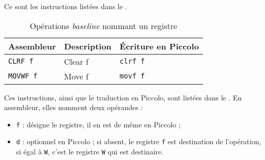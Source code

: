 
Ce sont les instructions listées dans le .



\begin{table}[!ht]
  \centering
  \small
  \begin{tabular}{lll}
    \textbf{Assembleur} & \textbf{Description} & \textbf{Écriture en Piccolo}\\
    \hline
    \texttt{CLRF f} & Clear f & \texttt{clrf f} \\
    \texttt{MOVWF f} & Move f & \texttt{movf f} \\
  \hline
  \end{tabular}
  \caption{Opérations \emph{baseline} nommant un registre}
\end{table}









Ces instructions, ainsi que le traduction en Piccolo, sont listées dans le . En assembleur, elles nomment deux opérandes :
\begin{itemize}
  \item \texttt{f} : désigne le registre, il en est de même en Piccolo ;
  \item \texttt{d} : optionnel en Piccolo ; si absent, le registre \texttt{f} est destination de l'opération, si égal à \texttt{W}, c'est le registre \texttt{W} qui est destinaire.
\end{itemize}


